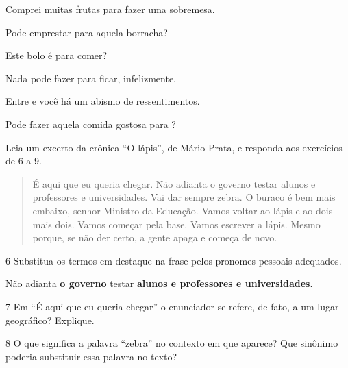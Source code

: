 \begin{escolha}
\item Comprei muitas frutas para  fazer uma sobremesa.
\item Pode emprestar para  aquela borracha?
\item Este bolo é para  comer?
\item Nada pode fazer para  ficar, infelizmente.
\item Entre  e você há um abismo de ressentimentos.
\item Pode fazer aquela comida gostosa para ?
\end{escolha}

\noindent Leia um excerto da crônica ``O lápis'', de Mário Prata, e responda aos
exercícios de 6 a 9.

\begin{quote}
É aqui que eu queria chegar. Não adianta o governo testar alunos e
professores e universidades. Vai dar sempre zebra. O buraco é bem mais
embaixo, senhor Ministro da Educação. Vamos voltar ao lápis e ao dois
mais dois. Vamos começar pela base. Vamos escrever a lápis. Mesmo
porque, se não der certo, a gente apaga e começa de novo.

\end{quote}

\num{6} Substitua os termos em destaque na frase pelos pronomes pessoais
adequados.

\noindent Não adianta \textbf{o governo} testar \textbf{alunos e professores e
universidades}.


\num{7} Em ``É aqui que eu queria chegar'' o enunciador se refere, de
fato, a um lugar geográfico? Explique.


\num{8} O que significa a palavra ``zebra'' no contexto em que aparece?
Que sinônimo poderia substituir essa palavra no texto?



